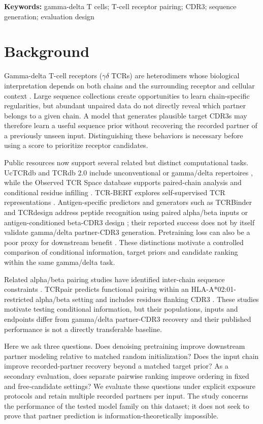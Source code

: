 \documentclass[12pt]{article}
\newcommand{\gd}{\ensuremath{\gamma\delta}}
\begin{document}
\noindent\textbf{Keywords:} gamma-delta T cells; T-cell receptor pairing; CDR3;
sequence generation; evaluation design

\section{Background}
Gamma-delta T-cell receptors (\gd{} TCRs) are heterodimers whose biological interpretation
depends on both chains and the surrounding receptor and cellular context
\cite{gd_review}.
Large sequence collections create opportunities to learn chain-specific
regularities, but abundant unpaired data do not directly reveal which partner
belongs to a given chain. A model that generates plausible target CDR3s may
therefore learn a useful sequence prior without recovering the recorded partner
of a previously unseen input. Distinguishing these behaviors is necessary before
using a score to prioritize receptor candidates.

Public resources now support several related but distinct computational tasks.
UcTCRdb and TCRdb 2.0 include unconventional or gamma/delta repertoires
\cite{uctcrdb,tcrdb2}, while the Observed TCR Space database supports paired-chain
analysis and conditional residue infilling \cite{ots}. TCR-BERT explores
self-supervised TCR representations \cite{tcrbert}. Antigen-specific predictors
and generators such as TCRBinder and TCRdesign address peptide recognition using
paired alpha/beta inputs or antigen-conditioned beta-CDR3 design
\cite{tcrbinder,tcrdesign}; their reported
success does not by itself validate gamma/delta partner-CDR3 generation.
Pretraining loss can also be a poor proxy for downstream benefit
\cite{landry2025}. These distinctions motivate a controlled comparison of
conditional information, target priors and candidate ranking within the same
gamma/delta task.

Related alpha/beta pairing studies have identified inter-chain sequence
constraints \cite{pairing_constraints}. TCRpair predicts functional pairing
within an HLA-A*02:01-restricted alpha/beta setting and includes residues flanking
CDR3 \cite{tcrpair}. These studies motivate testing conditional information, but
their populations, inputs and endpoints differ from gamma/delta partner-CDR3
recovery and their published performance is not a directly transferable baseline.

Here we ask three questions. Does denoising pretraining improve downstream
partner modeling relative to matched random initialization? Does the input
chain improve recorded-partner recovery beyond a matched target prior? As a
secondary evaluation, does separate pairwise ranking improve ordering in fixed
and free-candidate settings? We evaluate these questions under explicit exposure
protocols and retain multiple recorded partners per input. The study concerns
the performance of the tested model family on this dataset; it does not seek to
prove that partner prediction is information-theoretically impossible.
\end{document}
